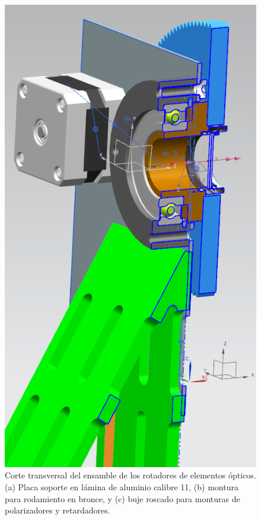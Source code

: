 \begin{figure}
\centering
\label{fig:plano_ensamble}
\includegraphics[scale = .8]{Montaje.png} 
\caption[Corte transversal del ensamble de los rotadores de elementos
ópticos]{Corte transversal del ensamble de los rotadores de elementos
  ópticos. (a) Placa soporte en lámina de aluminio calibre 11, (b)
  montura para rodamiento en bronce, y (c) buje roscado para monturas
  de polarizadores y retardadores. }
\end{figure}




